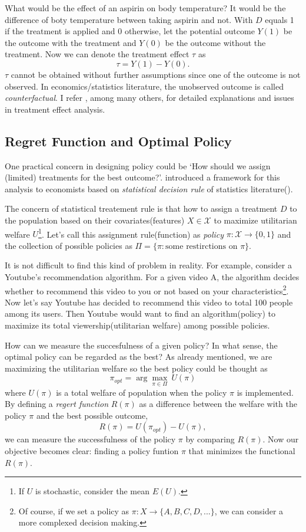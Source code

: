 \documentclass[11pt]{article}
\begin{document}
	What would be the effect of an aspirin on body temperature? It would be the difference of boty temperature between taking aspirin and not. With $D$ equals 1 if the treatment is applied and 0 otherwise, let the potential outcome $Y(1)$ be the outcome with the treatment and $Y(0)$ be the outcome without the treatment. Now we can denote the treatment effect $\tau$ as
	$$
	\tau = Y(1) - Y(0).
	$$
	$\tau$ cannot be obtained without further assumptions since one of the outcome is not observed. In economics/statistics literature, the unobserved outcome is called \textit{counterfactual}. I refer \cite{imbens2015causal}, among many others,  for detailed explanations and issues in treatment effect analysis.
	
	\subsection*{Regret Function and Optimal Policy}
	One practical concern in designing policy could be `How should we assign (limited) treatments for the best outcome?'.
	 \cite{Manski.2004} introduced a framework for this analysis to economists based on \textit{statistical decision rule} of statistics literature(\cite{wald1950statistical}). 
	 
	 The concern of statistical treatement rule is that how to assign a treatment $D$ to the population based on their covariates(features) $X \in \mathcal{X}$ to maximize utilitarian welfare $U$\footnote{If $U$ is stochastic, consider the mean $E(U)$.}. Let's call this assignment rule(function) as \textit{policy} $\pi:\mathcal{X} \rightarrow \{0,1\}$ and the collection of possible policies as $\Pi=\{\pi: \text{some restirctions on } \pi\}$.
	 
	 It is not difficult to find this kind of problem in reality. For example, consider a Youtube's recommendation algorithm. For a given video A, the algorithm decides whether to recommend this video to you or not based on your characteristics\footnote{Of course, if we set a policy as $\pi:X \rightarrow \{A,B,C,D,...\}$, we can consider a more complexed decision making.}. Now let's say Youtube has decided to  recommend this video to total 100 people among its users. Then Youtube would want to find an algorithm(policy) to maximize its total viewership(utilitarian welfare) among possible policies.
	 
	 How can we measure the succesfulness of a given policy? In what sense, the optimal policy can be regarded as the best? As already mentioned, we are maximizing the utilitarian welfare so the best policy could be thought as
	 $$
	 \pi_{opt} = \arg \max_{\pi \in \Pi} ~U(\pi)
	 $$
	 where $U(\pi)$ is a total welfare of population when the policy $\pi$ is implemented. By defining a \textit{regert function} $R(\pi)$ as a difference between the welfare with the policy $\pi$ and the best possible outcome,
	 $$
	 R(\pi) = U(\pi_{opt}) - U(\pi),
	 $$
	 we can measure the successfulness of the policy $\pi$ by comparing $R(\pi)$. Now our objective becomes clear: finding a policy funtion $\pi$ that minimizes the functional $R(\pi)$.
	 
\end{document}
